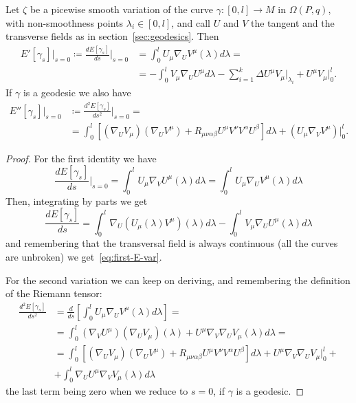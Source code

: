 \begin{lemma}
	Let \(\zeta\) be a picewise smooth variation of the curve \(\gamma: [0, l] \rightarrow M\)  in \(\Omega(P, q)\), with non-smoothness points \(\lambda_i \in [0, l]\), and call \(U\) and \(V\) the tangent and the transverse fields as in section~\ref{sec:geodesics}. Then
	\begin{align}
		E'[\gamma_s]\vert_{s = 0} \coloneqq \frac{dE[\gamma_s]}{ds}\Big\vert_{s = 0} &= 
		\int_{0}^{l} U_{\mu}\nabla_UV^{\mu}(\lambda) d\lambda = \\
		&= - \int_{0}^{l}  V_{\mu}\nabla_UU^{\mu}d\lambda - \sum_{i = 1}^{k} \Delta U^{\mu}V_{\mu}\Big\vert_{\lambda_i} + U^{\mu}V_{\mu}\Big\vert^l_0.
		\label{eq:first-E-var}
	\end{align}
	If \(\gamma\) is a geodesic we also have
	\begin{align}
		E''[\gamma_s]\vert_{s = 0} &\coloneqq \frac{d^2E[\gamma_s]}{ds^2}\Big\vert_{s = 0} = \\
		&= \int_{0}^{l} \left[(\nabla_UV_{\mu})(\nabla_UV^{\mu}) + R_{\mu\nu\alpha\beta}U^{\mu}V^{\nu}V^{\alpha}U^{\beta}\right] d\lambda + (U_{\mu}\nabla_VV^{\mu})\Big\vert_0^l.
		\label{eq:second-E-var}
	\end{align}
	
\end{lemma}

\begin{proof}
	For the first identity we have
	\begin{equation*}
		\frac{dE[\gamma_s]}{ds}\Big\vert_{s = 0}  = \int_{0}^{l} U_{\mu}\nabla_VU^{\mu}(\lambda) d\lambda = \int_{0}^{l} U_{\mu}\nabla_UV^{\mu}(\lambda) d\lambda
	\end{equation*}
Then, integrating by parts we get 
\begin{equation*}
	\frac{dE[\gamma_s]}{ds} = \int_{0}^{l} \nabla_U\left(U_{\mu}(\lambda)V^{\mu}\right)(\lambda) d\lambda - \int_{0}^{l} V_{\mu}\nabla_UU^{\mu}(\lambda) d\lambda
\end{equation*}
 and remembering that the transversal field is always continuous (all the curves are unbroken) we get~\eqref{eq:first-E-var}.
 
 For the second variation we can keep on deriving, and remembering the definition of the Riemann tensor:
 \begin{align*}
 	\frac{d^2E[\gamma_s]}{ds^2} &= \frac{d}{ds} \left[\int_{0}^{l} U_{\mu}\nabla_UV^{\mu}(\lambda) d\lambda\right] = \\
 	&= \int_{0}^{l} (\nabla_VU^{\mu})(\nabla_UV_{\mu})(\lambda) + U^{\mu} \nabla_V\nabla_UV_{\mu} (\lambda) d\lambda=\\
 	&= \int_{0}^{l} \left[(\nabla_UV_{\mu})(\nabla_UV^{\mu}) + R_{\mu\nu\alpha\beta}U^{\mu}V^{\nu}V^{\alpha}U^{\beta}\right] d\lambda + U^{\mu} \nabla_V\nabla_UV_{\mu} \Big\vert_0^l +\\
 	&+  \int_{0}^{l} \nabla_UU^{\mu} \nabla_VV_{\mu} (\lambda) d\lambda
 \end{align*}
	the last term being zero when we reduce to \(s = 0\), if \(\gamma\) is a geodesic.

\end{proof}

